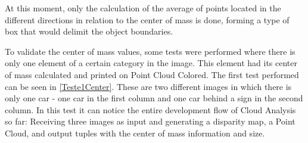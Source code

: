     At this moment, only the calculation of the average of points located in the different directions in relation to the center of mass is done, forming a type of box that would delimit the object boundaries.
    
    To validate the center of mass values, some tests were performed where there is only one element of a certain category in the image. This element had its center of mass calculated and printed on Point Cloud Colored. The first test performed can be seen in \autoref{Teste1Center}. These are two different images in which there is only one car - one car in the first column and one car behind a sign in the second column. In this test it can notice the entire development flow of Cloud Analysis so far: Receiving three images as input and generating a disparity map, a Point Cloud, and output tuples with the center of mass information and size.

